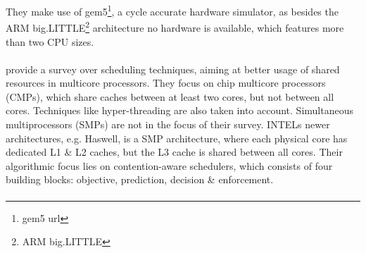They make use of gem5\footnote{gem5 url}, a cycle accurate hardware simulator,
as besides the ARM big.LITTLE\footnote{ARM big.LITTLE} architecture no
hardware is available, which features more than two CPU sizes.


\paragraph{ \cite{hofmeyr_load_2010} }

\paragraph{ \cite{cruz_dynamic_2014} }

\paragraph{ \cite{zhuravlev_survey_2012} } \citeauthor{zhuravlev_survey_2012}
provide a survey over scheduling techniques, aiming at better usage of shared
resources in multicore processors.
They focus on chip multicore processors (CMPs), which share caches between at
least two cores, but not between all cores.
Techniques like hyper-threading are also taken into account.
Simultaneous multiprocessors (SMPs) are not in the focus of their survey.
INTELs newer architectures, e.g. Haswell, is a SMP architecture, where each
physical core has dedicated L1 \& L2 caches, but the L3 cache is shared between
all cores.
Their algorithmic focus lies on contention-aware schedulers, which consists of
four building blocks: objective, prediction, decision \& enforcement.



\paragraph{ \cite{knauerhase_using_2008} }
\paragraph{ \cite{yarom_recovering_2014} }
\paragraph{ \cite{bernstein_cache-timing_2005} }
\paragraph{ \cite{eyerman_probabilistic_2010} }
\paragraph{ \cite{fedorova_managing_2010} }
\paragraph{ \cite{zhuravlev_addressing_2010} }
\paragraph{ \cite{liu_last-level_2015} }

\cleardoublepage

